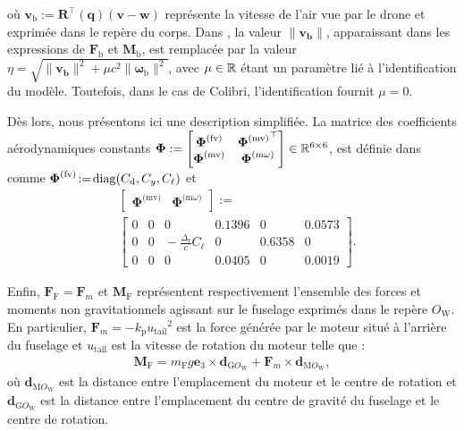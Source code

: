 \endgroup
où $\boldsymbol{v}_{\text{b}} := \boldsymbol{R}^\top(\boldsymbol{q}) (\boldsymbol{v}-\boldsymbol{w})$ représente la vitesse de l'air vue par le drone et exprimée dans le repère du corps. Dans \cite{lustosaHal-03035938}, la valeur $\lVert \boldsymbol{v_{\text{b}}} \rVert$, apparaissant dans les expressions de  $\boldsymbol{F}_{\text{b}}$ et $\boldsymbol{M}_{\text{b}}$, est remplacée par la valeur $\eta = \sqrt{\lVert \boldsymbol{v_{\text{b}}} \rVert^{2} + \mu c^{2} \lVert \boldsymbol{\omega}_{\text{b}} \rVert^{2}}$, avec $\mu \in {\mathbb R}$ étant un paramètre lié à l'identification du modèle. Toutefois, dans le cas de Colibri, l'identification fournit $\mu = 0$. 

Dès lors, nous présentons ici une description simplifiée. La matrice des coefficients aérodynamiques constants 
$\boldsymbol{\Phi}:= \begin{bmatrix} \boldsymbol{\Phi}^{\text{(fv)}} & {\boldsymbol{\Phi}^{\text{(mv)}}}^\top \\ \boldsymbol{\Phi}^{\text{(mv)}} & \boldsymbol{\Phi}^{\text{(m$\omega$)}} \end{bmatrix} \in {\mathbb R}^{6 \times 6}$, est définie dans \cite[eqs. (6)--(9)]{olszaneckibarthHal-02542982} comme $ \boldsymbol{\Phi}^{\text{(fv)}} \!:=\! \operatorname{diag}(C_{\text{d}},C_{y}, C_{\ell})$ et
\begin{align*}
&\left[ \begin{array}{c|c}
    \boldsymbol{\Phi}^{\text{(mv)}}  &  \boldsymbol{\Phi}^{\text{(m$\omega$)}} 
\end{array}\right] :=\\ 
&\left[ \begin{array}{ccc|ccc}
    0 & 0 & 0    &                                          0.1396 & 0 & 0.0573 \\
    0 & 0 & \!\!\!\!\! -\frac{\Delta_{\text{r}}}{c}C_{\ell} &    0 &  0.6358  & 0 \\
    0 & 0 & 0 &     0.0405 & 0 & 0.0019 
\end{array}\right].
\end{align*}




Enfin, $\boldsymbol{F}_{\text{F}} = \boldsymbol{F}_{m}$ et $\boldsymbol{M}_{\text{F}}$ représentent respectivement l'ensemble des forces et moments non gravitationnels agissant sur le fuselage exprimés dans le repère $O_{\text{W}}$. En particulier, $\boldsymbol{F}_{m} = - k_{\text{p}} {u_{\text{tail}}}^{2}$ est la force générée par le moteur situé à l'arrière du fuselage et $u_{\text{tail}}$ est la vitesse de rotation du moteur telle que :
\begin{align}
    \boldsymbol{M}_{\text{F}} =  m_{\text{F}} g \boldsymbol{e}_3 \times \boldsymbol{d}_{\text{G}O_{\text{W}}} + \boldsymbol{F}_{m} \times \boldsymbol{d}_{\text{M}O_{\text{W}}},
\end{align}
où $\boldsymbol{d}_{\text{M}O_{\text{W}}}$ est la distance entre l'emplacement du moteur et le centre de rotation et $\boldsymbol{d}_{\text{G}O_{\text{W}}}$ est la distance entre l'emplacement du centre de gravité du fuselage et le centre de rotation.


